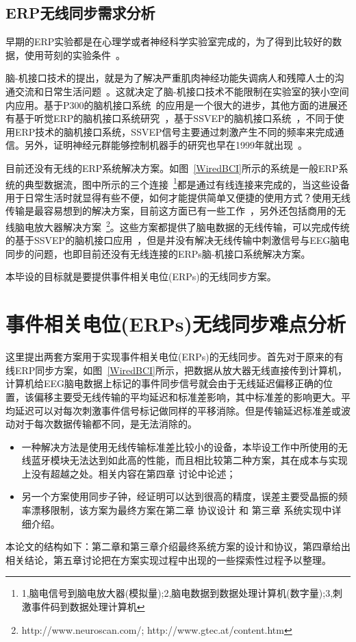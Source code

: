 \subsection{ERP无线同步需求分析}

早期的ERP实验都是在心理学或者神经科学实验室完成的，为了得到比较好的数据，使用苛刻的实验条件~\cite{LuckAugust12005}。

脑-机接口技术的提出，就是为了解决严重肌肉神经功能失调病人和残障人士的沟通交流和日常生活问题~\cite{Allison2007}。这就决定了脑-机接口技术不能限制在实验室的狭小空间内应用。基于P300的脑机接口系统~\cite{FARWELL1988}\cite{Krusienski2008}的应用是一个很大的进步，其他方面的进展还有基于听觉ERP的脑机接口系统研究~\cite{Hinterberger2004}\cite{Hong2010}，基于SSVEP的脑机接口系统~\cite{Wang2006}，不同于使用ERP技术的脑机接口系统，SSVEP信号主要通过刺激产生不同的频率来完成通信。另外，证明神经元群能够控制机器手的研究也早在1999年就出现~\cite{Chapin1999}。

	目前还没有无线的ERP系统解决方案。如图~\ref{WiredBCI}所示的系统是一般ERP系统的典型数据流，图中所示的三个连接~\footnote{1,脑电信号到脑电放大器(模拟量);2,脑电数据到数据处理计算机(数字量);3,刺激事件码到数据处理计算机}都是通过有线连接来完成的，当这些设备用于日常生活时就显得有些不便，如何才能提供简单又便捷的使用方式？使用无线传输是最容易想到的解决方案，目前这方面已有一些工作~\cite{Chumerin2009}\cite{Lin2008}，另外还包括商用的无线脑电放大器解决方案~\footnote{http://www.neuroscan.com/; http://www.gtec.at/content.htm}。这些方案都提供了脑电数据的无线传输，可以完成传统的基于SSVEP的脑机接口应用~\cite{Xu2009}，但是并没有解决无线传输中刺激信号与EEG脑电同步的问题，也即目前还没有无线连接的ERPs脑-机接口系统解决方案。

	本毕设的目标就是要提供事件相关电位(ERPs)的无线同步方案。
\section{事件相关电位(ERPs)无线同步难点分析}

这里提出两套方案用于实现事件相关电位(ERPs)的无线同步。首先对于原来的有线ERP同步方案，如图~\ref{WiredBCI}所示，把数据从放大器无线直接传到计算机，计算机给EEG脑电数据上标记的事件同步信号就会由于无线延迟偏移正确的位置，该偏移主要受无线传输的平均延迟和标准差影响，其中标准差的影响更大。平均延迟可以对每次刺激事件信号标记做同样的平移消除。但是传输延迟标准差或波动对于每次数据传输都不同，是无法消除的。
\begin{itemize}
\item 一种解决方法是使用无线传输标准差比较小的设备，本毕设工作中所使用的无线蓝牙模块无法达到如此高的性能，而且相比较第二种方案，其在成本与实现上没有超越之处。相关内容在第四章 讨论中论述；
\item 另一个方案使用同步子钟，经证明可以达到很高的精度，误差主要受晶振的频率漂移限制，该方案为最终方案在第二章 协议设计 和 第三章 系统实现中详细介绍。
\end{itemize}

本论文的结构如下：第二章和第三章介绍最终系统方案的设计和协议，第四章给出相关结论，第五章讨论把在方案实现过程中出现的一些探索性过程予以整理。


